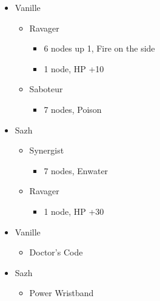 \begin{paracol}{2}
\begin{menu}
\begin{itemize}
			\crystarium
			\begin{itemize}
				\item Vanille
				      \begin{itemize}
					      \item Ravager
					            \begin{itemize}
						            \item 6 nodes up 1, Fire on the side
						            \item 1 node, HP +10
					            \end{itemize}
					      \item Saboteur
					            \begin{itemize}
						            \item 7 nodes, Poison
					            \end{itemize}
				      \end{itemize}
				\item Sazh
				      \begin{itemize}
					      \item Synergist
					            \begin{itemize}
						            \item 7 nodes, Enwater
					            \end{itemize}
					      \item Ravager
					            \begin{itemize}
						            \item 1 node, HP +30
					            \end{itemize}
				      \end{itemize}
			\end{itemize}
			\equip
			\begin{itemize}
				\item Vanille
				      \begin{itemize}
					      \item Doctor's Code
				      \end{itemize}
				\item Sazh
				      \begin{itemize}
					      \item Power Wristband
				      \end{itemize}
			\end{itemize}
		\end{itemize}
\end{menu}
\switchcolumn
\begin{menu}

\end{menu}
\end{paracol}

